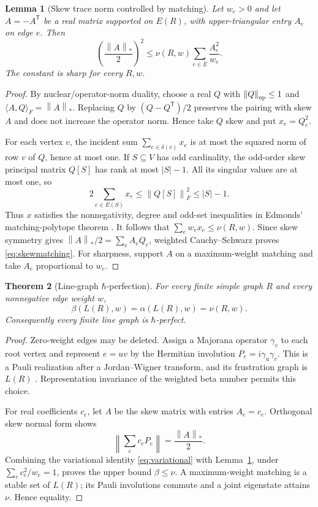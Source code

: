 \documentclass[11pt,a4paper]{article}
\newtheorem{theorem}{Theorem}[section]
\newtheorem{lemma}[theorem]{Lemma}
\theoremstyle{remark}\newtheorem{remark}[theorem]{Remark}
\newcommand{\norm}[1]{\left\lVert#1\right\rVert}
\begin{document}
\begin{lemma}[Skew trace norm controlled by matching]\label{lem:skewmatching}
Let $w_e>0$ and let $A=-A^{\mathsf T}$ be a real matrix supported on
$E(R)$, with upper-triangular entry $A_e$ on edge $e$. Then
\begin{equation}\label{eq:skewmatching}
 \left(\frac{\norm{A}_*}{2}\right)^2
 \leq \nu(R,w)\sum_{e\in E}\frac{A_e^2}{w_e}.
\end{equation}
The constant is sharp for every $R,w$.
\end{lemma}
\begin{proof}
By nuclear/operator-norm duality, choose a real $Q$ with
$\norm{Q}_{\rm op}\leq1$ and
$\langle A,Q\rangle_F=\norm{A}_*$. Replacing $Q$ by
$(Q-Q^{\mathsf T})/2$ preserves the pairing with skew $A$ and does not
increase the operator norm. Hence take $Q$ skew and put $x_e=Q_e^2$.

For each vertex $v$, the incident sum $\sum_{e\in\delta(v)}x_e$ is at
most the squared norm of row $v$ of $Q$, hence at most one. If
$S\subseteq V$ has odd cardinality, the odd-order skew principal matrix
$Q[S]$ has rank at most $|S|-1$. All its singular values are at most
one, so
\[
 2\sum_{e\in E(S)}x_e\leq\norm{Q[S]}_F^2\leq |S|-1.
\]
Thus $x$ satisfies the nonnegativity, degree and odd-set inequalities
in Edmonds' matching-polytope theorem \cite{edmonds}. It follows that
$\sum_e w_ex_e\leq\nu(R,w)$. Since skew symmetry gives
$\norm{A}_*/2=\sum_e A_eQ_e$, weighted Cauchy--Schwarz proves
\eqref{eq:skewmatching}. For sharpness, support $A$ on a
maximum-weight matching and take $A_e$ proportional to $w_e$.
\end{proof}

\begin{theorem}[Line-graph $\hbar$-perfection]\label{thm:line}
For every finite simple graph $R$ and every nonnegative edge weight $w$,
\[
 \beta(L(R),w)=\alpha(L(R),w)=\nu(R,w).
\]
Consequently every finite line graph is $\hbar$-perfect.
\end{theorem}
\begin{proof}
Zero-weight edges may be deleted. Assign a Majorana operator $\gamma_v$
to each root vertex and represent $e=uv$ by the Hermitian involution
$P_e=i\gamma_u\gamma_v$. This is a Pauli realization after a
Jordan--Wigner transform, and its frustration graph is $L(R)$
\cite{cf}. Representation invariance of the weighted beta number
\cite{xu} permits this choice.

For real coefficients $c_e$, let $A$ be the skew matrix with entries
$A_e=c_e$. Orthogonal skew normal form shows
\[
 \norm{\sum_e c_eP_e}=\frac{\norm{A}_*}{2}.
\]
Combining the variational identity \eqref{eq:variational} with
Lemma~\ref{lem:skewmatching}, under
$\sum_e c_e^2/w_e=1$, proves the upper bound $\beta\leq\nu$.
A maximum-weight matching is a stable set of $L(R)$; its Pauli
involutions commute and a joint eigenstate attains $\nu$. Hence equality.
\end{proof}
\end{document}
